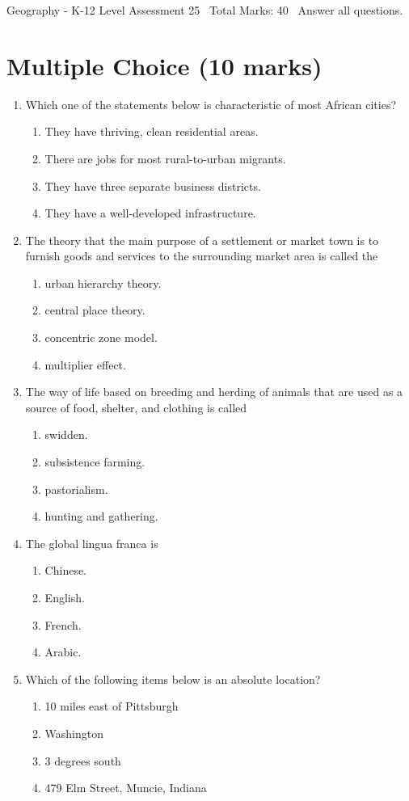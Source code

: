 \documentclass[12pt]{article}
\begin{document}
\begin{center}
Geography - K-12 Level Assessment 25 \
Total Marks: 40 \
Answer all questions.
\end{center}

\section*{Multiple Choice (10 marks)}
\begin{enumerate}[label=\arabic*.]
\item Which one of the statements below is characteristic of most African cities?
\begin{enumerate}[label=(\alph*)]
    \item They have thriving, clean residential areas.
    \item There are jobs for most rural-to-urban migrants.
    \item They have three separate business districts.
    \item They have a well-developed infrastructure.
\end{enumerate}
\item The theory that the main purpose of a settlement or market town is to furnish goods and services to the surrounding market area is called the
\begin{enumerate}[label=(\alph*)]
    \item urban hierarchy theory.
    \item central place theory.
    \item concentric zone model.
    \item multiplier effect.
\end{enumerate}
\item The way of life based on breeding and herding of animals that are used as a source of food, shelter, and clothing is called
\begin{enumerate}[label=(\alph*)]
    \item swidden.
    \item subsistence farming.
    \item pastorialism.
    \item hunting and gathering.
\end{enumerate}
\item The global lingua franca is
\begin{enumerate}[label=(\alph*)]
    \item Chinese.
    \item English.
    \item French.
    \item Arabic.
\end{enumerate}
\item Which of the following items below is an absolute location?
\begin{enumerate}[label=(\alph*)]
    \item 10 miles east of Pittsburgh
    \item Washington
    \item 3 degrees south
    \item 479 Elm Street, Muncie, Indiana
\end{enumerate}
\end{enumerate}
\end{document}
